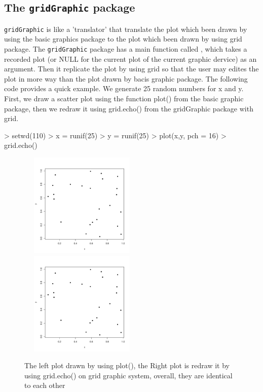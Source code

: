 \documentclass[a4paper,10pt]{article}
\begin{document}
\subsection{The \texttt{gridGraphic} package}
\texttt{gridGraphic} is like a 'translator' that translate the plot which been drawn by using the basic graphics package to the plot which been drawn by using grid package. 
The \texttt{gridGraphic} package has a main function called , which takes a recorded plot (or NULL for the current plot of the current graphic dervice) as an argument. Then it replicate the 
plot by using grid so that the user may edites the plot in more way than the plot drawn by bacis graphic package.
The following code provides a quick example. We generate 25 random numbers for x and y. First, we draw a scatter plot using the function plot() from the basic graphic package, then we redraw it using grid.echo() from the gridGraphic package with grid.
\begin{Schunk}
\begin{Sinput}
> setwd(110)
> x = runif(25)
> y = runif(25)
> plot(x,y, pch = 16)
> grid.echo()
\end{Sinput}
\end{Schunk}
\begin{figure}[H]
\begin{center}
  \includegraphics[height = 5cm, width = 6cm]{figure/basic.pdf}
  \includegraphics[height = 5cm, width = 6cm]{figure/echo.pdf}
  \caption{The left plot drawn by using plot(), the Right plot is redraw it by using grid.echo() on grid graphic system, overall, they are identical to each other}
  	\label{figure1}
\end{center}
\end{figure}
\end{document}
